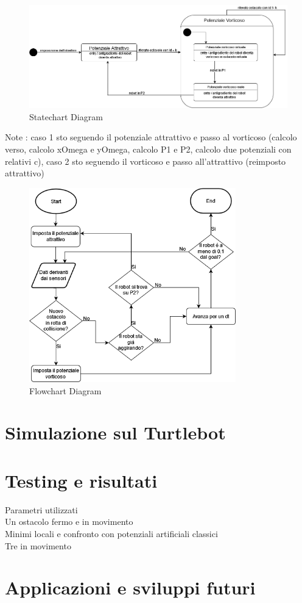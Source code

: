 \documentclass[14pt,twoside,a4paper]{extarticle}
\begin{document}
\begin{figure}[H]
\caption{Statechart Diagram} \label{state}
\includegraphics[width=\textwidth]{stateDiagram.png}
\end{figure}
	
Note	: caso 1 sto seguendo il potenziale attrattivo e passo al vorticoso (calcolo verso, calcolo xOmega e yOmega, calcolo P1 e P2, calcolo due potenziali con relativi c), caso 2 sto seguendo il vorticoso e passo all'attrattivo (reimposto attrattivo)
	
\begin{figure}[H]
\caption{Flowchart Diagram} \label{flow}
\centering
\includegraphics[width=0.8\textwidth]{flowchartDiagram.png}
\end{figure}

\section{Simulazione sul Turtlebot}

\section{Testing e risultati}
Parametri utilizzati\\
Un ostacolo fermo e in movimento\\
Minimi locali e confronto con potenziali artificiali classici\\
Tre in movimento\\

\section{Applicazioni e sviluppi futuri}

\newpage
\listoffigures
\printbibliography
\end{document}
